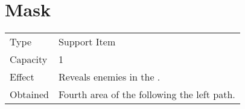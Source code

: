 \section{Mask}
\label{item:mask}


\noindent\begin{tabularx}{\textwidth}[l]{lX}
	Type
	& Support Item
\\ %
	Capacity
	& 1
\\ %
	Effect
	& Reveals enemies in the \nameref{map:volcano}.
\\ %
	Obtained
	& Fourth area of the \nameref{map:volcano} following the left path.
\end{tabularx}
